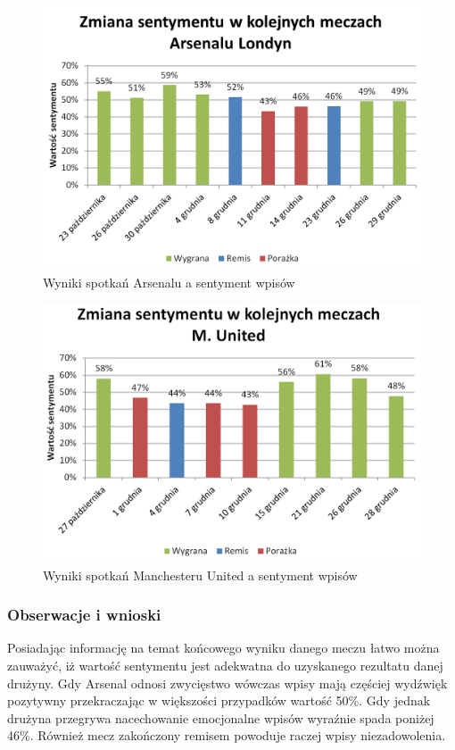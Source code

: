 \begin{figure}[ht!]
\centering
\includegraphics[width=120mm]{img/pozytywnosc-arsenal2.png}
\caption{Wyniki spotkań Arsenalu a sentyment wpisów}
\label{image:pozytywnosc-arsenal}
\end{figure}

\clearpage
\begin{figure}[ht!]
\centering
\includegraphics[width=120mm]{img/pozytywnosc-munited2.png}
\caption{Wyniki spotkań Manchesteru United a sentyment wpisów}
\label{image:pozytywnosc-munited}
\end{figure}

\subsubsection{Obserwacje i wnioski}
Posiadając informację na temat końcowego wyniku danego meczu łatwo można 
zauważyć, iż wartość sentymentu jest adekwatna do uzyskanego rezultatu danej 
drużyny. Gdy Arsenal odnosi zwycięstwo wówczas wpisy mają częściej wydźwięk
pozytywny przekraczając w większości przypadków wartość 50\%. Gdy jednak 
drużyna przegrywa nacechowanie emocjonalne wpisów wyraźnie spada poniżej 46\%.
Również mecz zakończony remisem powoduje raczej wpisy niezadowolenia.
 
